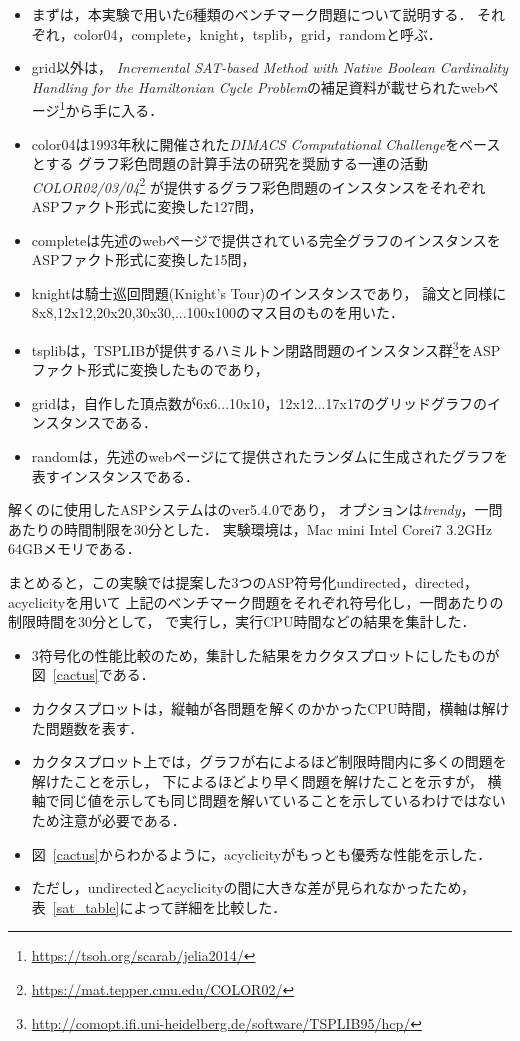 \begin{itemize}
\item まずは，本実験で用いた6種類のベンチマーク問題について説明する．
それぞれ，color04，complete，knight，tsplib，grid，randomと呼ぶ．
\item grid以外は，
\textit{Incremental SAT-based Method with Native Boolean Cardinality Handling for the Hamiltonian Cycle Problem}\cite{soh14:jelia2014}の補足資料が載せられたwebページ\footnote{\url{https://tsoh.org/scarab/jelia2014/}}から手に入る．

\item color04は1993年秋に開催された\textit{DIMACS Computational Challenge}をベースとする
グラフ彩色問題の計算手法の研究を奨励する一連の活動
\textit{COLOR02/03/04}\footnote{\url{https://mat.tepper.cmu.edu/COLOR02/}}
が提供するグラフ彩色問題のインスタンスをそれぞれASPファクト形式に変換した127問，
\item completeは先述のwebページ\footnotemark[1]で提供されている完全グラフのインスタンスをASPファクト形式に変換した15問，
\item knightは騎士巡回問題(Knight's Tour)のインスタンスであり，
論文\cite{soh14:jelia2014}と同様に8x8,12x12,20x20,30x30,...100x100のマス目のものを用いた．
\item tsplibは，TSPLIBが提供するハミルトン閉路問題のインスタンス群\footnote{\url{http://comopt.ifi.uni-heidelberg.de/software/TSPLIB95/hcp/}}をASPファクト形式に変換したものであり，
\item gridは，自作した頂点数が6x6...10x10，12x12...17x17のグリッドグラフのインスタンスである．
\item randomは，先述のwebページ\footnotemark[1]にて提供されたランダムに生成されたグラフを表すインスタンスである．
\end{itemize}

解くのに使用したASPシステムは{\clingo}のver5.4.0であり，
オプションは\textit{trendy}，一問あたりの時間制限を30分とした．
実験環境は，Mac mini Intel Corei7 3.2GHz 64GBメモリである．

まとめると，この実験では提案した3つのASP符号化\textsf{undirected}，\textsf{directed}，\textsf{acyclicity}を用いて
上記のベンチマーク問題をそれぞれ符号化し，一問あたりの制限時間を30分として，
{\clingo}で実行し，実行CPU時間などの結果を集計した．

\begin{itemize}
\item 3符号化の性能比較のため，集計した結果をカクタスプロットにしたものが図~\ref{cactus}である．
\item カクタスプロットは，縦軸が各問題を解くのかかったCPU時間，横軸は解けた問題数を表す．
\item カクタスプロット上では，グラフが右によるほど制限時間内に多くの問題を解けたことを示し，
  下によるほどより早く問題を解けたことを示すが，
  横軸で同じ値を示しても同じ問題を解いていることを示しているわけではないため注意が必要である．
\item 図~\ref{cactus}からわかるように，\textsf{acyclicity}がもっとも優秀な性能を示した．
\item ただし，\textsf{undirected}と\textsf{acyclicity}の間に大きな差が見られなかったため，
  表~\ref{sat_table}によって詳細を比較した．
\end{itemize}

